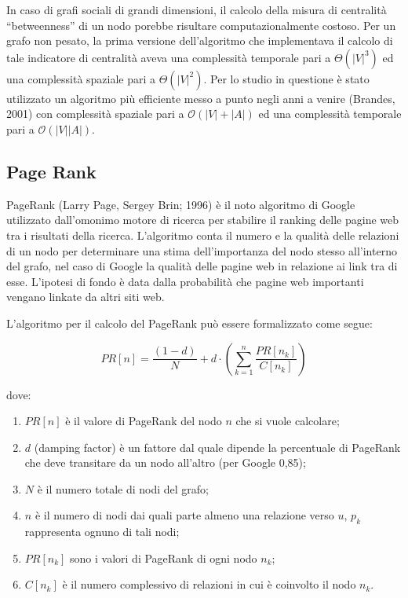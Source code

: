 In caso di grafi sociali di grandi dimensioni, il calcolo della misura di centralit{\`a} ``betweenness'' di un nodo porebbe risultare computazionalmente costoso. Per un grafo non pesato, la prima versione dell'algoritmo che implementava il calcolo di tale indicatore di centralit{\`a} aveva una complessit{\`a} temporale pari a $\Theta(\lvert V \rvert ^3)$ ed una complessit{\`a} spaziale pari a $\Theta(\lvert V \rvert ^2)$. Per lo studio in questione {\`e} stato utilizzato un algoritmo pi{\`u} efficiente messo a punto negli anni a venire \cite{Brandes-betweenness} (Brandes, 2001) con complessit{\`a} spaziale pari a $\mathcal{O}(\lvert V \rvert + \lvert A \rvert )$ ed una complessit{\`a} temporale pari a $\mathcal{O}(\lvert V \rvert \lvert A \rvert)$.

\subsection{Page Rank}

PageRank (Larry Page, Sergey Brin; 1996) {\`e} il noto algoritmo di Google utilizzato dall'omonimo motore di ricerca per stabilire il ranking delle pagine web tra i risultati della ricerca. L'algoritmo conta il numero e la qualit{\`a} delle relazioni di un nodo per determinare una stima dell'importanza del nodo stesso all'interno del grafo, nel caso di Google la qualit{\`a} delle pagine web in relazione ai link tra di esse. L'ipotesi di fondo {\`e} data dalla probabilit{\`a} che pagine web importanti vengano linkate da altri siti web. 

L'algoritmo per il calcolo del PageRank pu{\`o} essere formalizzato come segue:

\begin{equation}
PR[n] = \frac{(1 - d)}{N} + d \cdot (\sum_{k = 1}^n \frac{PR[n_{k}]}{C[n_k]} )
\end{equation}

dove:

\begin{enumerate}[label=(\roman*)]
  
\item \( PR[n] \) {\`e} il valore di PageRank del nodo \( n \) che si vuole calcolare;
\item \( d \) (damping factor) {\`e} un fattore dal quale dipende la percentuale di PageRank che deve transitare da un nodo all'altro (per Google 0,85);
\item \( N \) {\`e} il numero totale di nodi del grafo;
\item \( n \) {\`e} il numero di nodi dai quali parte almeno una relazione verso \( u \), \( p_k \) rappresenta ognuno di tali nodi;
\item \( PR[n_k] \) sono i valori di PageRank di ogni nodo \( n_k \);
\item \( C[n_k] \) {\`e} il numero complessivo di relazioni in cui {\`e} coinvolto il nodo \( n_k \).

\end{enumerate}

